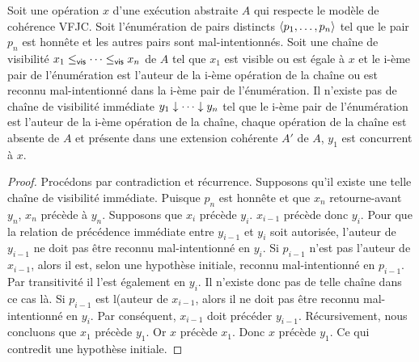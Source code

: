\begin{proposition}
Soit une opération $x$ d'une exécution abstraite $A$ qui respecte le modèle de cohérence \ac{VFJC}.
Soit l'énumération de pairs distincts $\tuple*{p_1, \dotsc ,p_n}$ tel que le pair $p_n$ est honnête et les autres pairs sont mal-intentionnés.
Soit une chaîne de visibilité $x_1 \viseq \dotsb \viseq x_n$ de $A$ tel que $x_1$ est visible ou est égale à $x$ et le i-ème pair de l'énumération est l'auteur de la i-ème opération de la chaîne ou est reconnu mal-intentionné dans la i-ème pair de l'énumération.
Il n'existe pas de chaîne de visibilité immédiate $y_1 \idr \dotsb \idr y_n$ tel que le i-ème pair de l'énumération est l'auteur de la i-ème opération de la chaîne, chaque opération de la chaîne est absente de $A$ et présente dans une extension cohérente $A'$ de $A$, $y_1$ est concurrent à $x$.
\end{proposition}

\begin{proof}
Procédons par contradiction et récurrence.
Supposons qu'il existe une telle chaîne de visibilité immédiate.
Puisque $p_n$ est honnête et que $x_n$ retourne-avant $y_n$, $x_n$ précède à $y_n$.
Supposons que $x_i$ précède $y_i$.
$x_{i-1}$ précède donc $y_i$.
Pour que la relation de précédence immédiate entre $y_{i-1}$ et $y_i$ soit autorisée, l'auteur de $y_{i-1}$ ne doit pas être reconnu mal-intentionné en $y_i$.
Si $p_{i-1}$ n'est pas l'auteur de $x_{i-1}$, alors il est, selon une hypothèse initiale, reconnu mal-intentionné en $p_{i-1}$.
Par transitivité il l'est également en $y_i$.
Il n'existe donc pas de telle chaîne dans ce cas là.
Si $p_{i-1}$ est l(auteur de $x_{i-1}$, alors il ne doit pas être reconnu mal-intentionné en $y_i$.
Par conséquent, $x_{i-1}$ doit précéder $y_{i-1}$.
Récursivement, nous concluons que $x_1$ précède $y_1$.
Or $x$ précède $x_1$.
Donc $x$ précède $y_1$.
Ce qui contredit une hypothèse initiale.
\end{proof}


